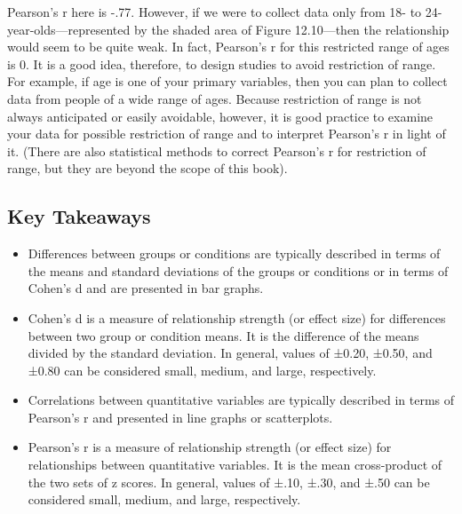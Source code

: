 Pearson's r here is -.77. However, if we were to collect data only from 18- to 24-year-olds---represented by the shaded area of Figure 12.10---then the relationship would seem to be quite weak. In fact, Pearson's r for this restricted range of ages is 0. It is a good idea, therefore, to design studies to avoid restriction of range. For example, if age is one of your primary variables, then you can plan to collect data from people of a wide range of ages. Because restriction of range is not always anticipated or easily avoidable, however, it is good practice to examine your data for possible restriction of range and to interpret Pearson's r in light of it. (There are also statistical methods to correct Pearson's r for restriction of range, but they are beyond the scope of this book).


\subsection{Key Takeaways}

\begin{fullwidth}
\begin{itemize}
\item Differences between groups or conditions are typically described in terms of the means and standard deviations of the groups or conditions or in terms of Cohen's d and are presented in bar graphs.

\item Cohen's d is a measure of relationship strength (or effect size) for differences between two group or condition means. It is the difference of the means divided by the standard deviation. In general, values of ±0.20, ±0.50, and ±0.80 can be considered small, medium, and large, respectively.

\item Correlations between quantitative variables are typically described in terms of Pearson's r and presented in line graphs or scatterplots.

\item Pearson's r is a measure of relationship strength (or effect size) for relationships between quantitative variables. It is the mean cross-product of the two sets of z scores. In general, values of ±.10, ±.30, and ±.50 can be considered small, medium, and large, respectively.

\end{itemize}
\end{fullwidth}


